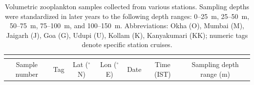 \documentclass[authoryear,review,11pt]{elsarticle}
\begin{document}
\newpage
\renewcommand{\baselinestretch}{0.98}
\setlongtables
	\begin{scriptsize}
	\begin{longtable}{ccccccc}
		\caption{Volumetric zooplankton samples collected from various stations. Sampling depths were standardized in later years to the following depth ranges: 0--25~m, 25--50~m, 50--75~m, 75--100~m, and 100--150~m. Abbreviations: Okha (O), Mumbai (M), Jaigarh (J), Goa (G), Udupi (U), Kollam (K), Kanyakumari (KK); numeric tags denote specific station cruises.} \\
		\label{tab:mpn} \\
		
		\toprule
		Sample number & Tag & Lat ($^{\circ}$N) & Lon ($^{\circ}$E) & Date & Time (IST) & Sampling depth range (m) \\
		\midrule[1.05pt]
		

\end{longtable}
\end{scriptsize}
\end{document}
